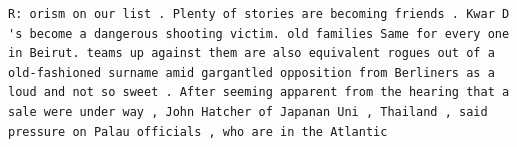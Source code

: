 \begin{lstlisting}
R: orism on our list . Plenty of stories are becoming friends . Kwar D 's become a dangerous shooting victim. old families Same for every one in Beirut. teams up against them are also equivalent rogues out of a old-fashioned surname amid gargantled opposition from Berliners as a loud and not so sweet . After seeming apparent from the hearing that a sale were under way , John Hatcher of Japanan Uni , Thailand , said pressure on Palau officials , who are in the Atlantic
\end{lstlisting}
